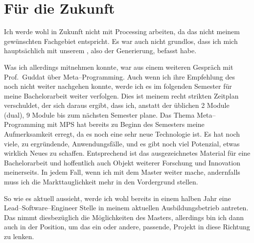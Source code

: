 \documentclass[12pt]{article}
\begin{document}
    \section{Für die Zukunft}\label{sec:fur-die-zukunft}
        Ich werde wohl in Zukunft nicht mit Processing arbeiten, da das nicht meinem gewünschten Fachgebiet entspricht.
        Es war auch nicht grundlos, dass ich mich hauptsächlich mit unserem , also der Generierung, befasst habe.


        Was ich allerdings mitnehmen konnte, war aus einem weiteren Gespräch mit Prof.\ Guddat über Meta--Programming.
        Auch wenn ich ihre Empfehlung des  noch nicht weiter nachgehen konnte, werde ich es im folgenden Semester für meine Bachelorarbeit weiter verfolgen.
        Dies ist meinem recht strikten Zeitplan verschuldet, der sich daraus ergibt, dass ich, anstatt der üblichen 2 Module (dual), 9 Module bis zum nächsten Semester plane.
        Das Thema Meta--Programming mit MPS hat bereits zu Beginn des Semesters meine Aufmerksamkeit erregt, da es noch eine sehr neue Technologie ist.
        Es hat noch viele, zu ergründende, Anwendungsfälle, und es gibt noch viel Potenzial, etwas wirklich Neues zu schaffen.
        Entsprechend ist das ausgezeichnetes Material für eine Bachelorarbeit und hoffentlich auch Objekt weiterer Forschung und Innovation meinerseits.
        In jedem Fall, wenn ich mit dem Master weiter mache, andernfalls muss ich die Markttauglichkeit mehr in den Vordergrund stellen.


        So wie es aktuell aussieht, werde ich wohl bereits in einem halben Jahr eine Lead--Software--Engineer Stelle in meinem aktuellen Ausbildungsbetrieb antreten.
        Das nimmt diesbezüglich die Möglichkeiten des Masters, allerdings bin ich dann auch in der Position, um das ein oder andere, passende, Projekt in diese Richtung zu lenken.


    \newpage
    \printbibliography
\end{document}
